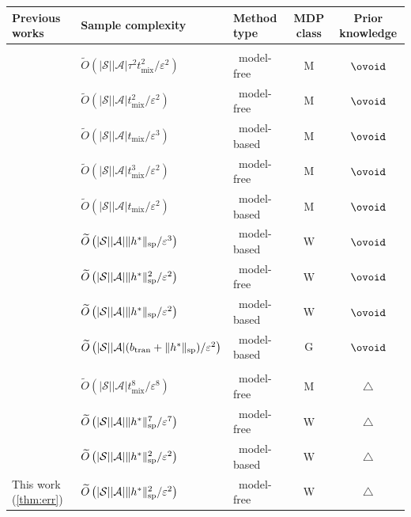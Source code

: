 \documentclass{article}
\newcommand{\cA}{\mathcal{A}}
\newcommand{\cS}{\mathcal{S}}
\renewcommand{\sp}[1]{\|{#1}\|_\text{\rm sp}}
\theoremstyle{plain}
\theoremstyle{definition}
\theoremstyle{remark}
\begin{document}
\begin{table}[!ht] \label{table1}
\centering
\begin{tabular}{|lllcc|} 
 \hline
{\bf Previous works} &{\bf Sample complexity}& {\bf Method type}&{\bf MDP class} & {\bf Prior knowledge} \\ 
 \hline\hline&&&&\\[-2.1ex]
 \citet{wang2017primal} & $\widetilde{O}\left({|\cS||\cA|\tau^2 t^2_{\text{mix}}}/{\varepsilon^{2}}\right)$  & ~model-free &M& $\ovoid$ \\[0.1ex]
\citet{jin2020efficiently}& $\widetilde{O}\left({|\cS||\cA|t^2_{\text{mix}}}/{\varepsilon^{2}}\right)$  & ~model-free &M& $\ovoid$
 \\[0.1ex] 
 \citet{jin2021towards}& $\widetilde{O}\left({|\cS||\cA|t_{\text{mix}}}/{\varepsilon^{3}}\right)$ & ~model-based  &M& $\ovoid$
 \\[0.1ex]
 \citet{li2024stochastic}& $\widetilde{O}\left({|\cS||\cA|t^3_{\text{mix}}}/{\varepsilon^{2}}\right)$ & ~model-free  & M& $\ovoid$\\[0.1ex]
 \citet{wang2023optimal}& $\widetilde{O}\left({|\cS||\cA|t_{\text{mix}}}/{\varepsilon^{2}}\right)$ & ~model-based  &M& $\ovoid$\\[0.1ex]
 \citet{wang2022near} & $\widetilde{O}\left({|\cS||\cA|\sp{h^*}}/{\varepsilon^{3}}\right)$& ~model-based  & W&  $\ovoid$\\[0.1ex]
  \citet{zhang2023sharper}& $\widetilde{O}\left({|\cS||\cA|\sp{h^*}^{2}}/{\varepsilon^{2}}\right)$& ~model-free  &  W& $\ovoid$
\\[0.1ex]
\citet{zurek2024span}& $\widetilde{O}\left({|\cS||\cA|\sp{h^*}}/{\varepsilon^{2}}\right)$& ~model-based   & W& $\ovoid$\\[0.1ex]
\citet{zurek2024span}& $\widetilde{O}\left({|\cS||\cA|(b_{\text{tran}}+\sp{h^*})}/{\varepsilon^{2}}\right)$& ~model-based   & G& $\ovoid$\\[0.6ex]\hline\hline
&&&&\\[-2.1ex]
 \citet{jin2024feasible}& $\widetilde{O}\left({|\cS||\cA|t^8_{\text{mix}}}/{\varepsilon^{8}}\right)$ & ~model-free &M& $\triangle$ \\[0.1ex]
 \citet{bravostochastic}& $\widetilde{O}\left({|\cS||\cA|\sp{h^*}^7}/{\varepsilon^{7}}\right)$ & ~model-free  &W& $\triangle$ \\[0.1ex]
\citet{zurek2024plug}& $\widetilde{O}\left(|\cS||\cA|\sp{h^*}^2/{\varepsilon^{2}}\right)$ & ~model-based &W& $\triangle$\\[0.1ex]
  This work (\cref{thm:err})& $\widetilde{O}\left({|\cS||\cA|\sp{h^*}^{2}}/{\varepsilon^{2}}\right)$& ~model-free  & W&  $\triangle$ \\[0.6ex]\hline\hline

\end{tabular}
\end{table}
\end{document}
